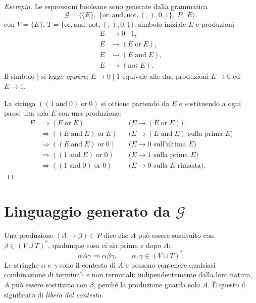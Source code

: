 \documentclass[a4paper, 11pt, oneside]{book}
\theoremstyle{formale}
\newenvironment{esempio}
    {\begin{proof}[\textit{Esempio}]\renewcommand{\qedsymbol}{$\diamond$}}
    {\end{proof}}
\begin{document}
    \begin{esempio}
        Le espressioni booleane sono generate dalla grammatica
        \begin{equation*}
            \mathcal{G} = \langle \{E\},\;
            \{\mathrm{or}, \mathrm{and}, \mathrm{not}, (, ), 0, 1\},\; P,\; E \rangle,
        \end{equation*}
        con $V = \{E\}$, $T = \{\mathrm{or}, \mathrm{and}, \mathrm{not}, (, ), 0, 1\}$,
        simbolo iniziale $E$ e produzioni
        \begin{align*}
            E &\to 0 \mid 1, \\
            E &\to (E \;\mathrm{or}\; E), \\
            E &\to (E \;\mathrm{and}\; E), \\
            E &\to (\mathrm{not}\; E).
        \end{align*}
        Il simbolo $\mid$ si legge \emph{oppure}: $E \to 0 \mid 1$ equivale alle due
        produzioni $E \to 0$ ed $E \to 1$.

        La stringa $((1 \;\mathrm{and}\; 0) \;\mathrm{or}\; 0)$ si ottiene partendo da $E$
        e sostituendo a ogni passo una sola $E$ con una produzione:
        \begin{align*}
            E &\Rightarrow (E \;\mathrm{or}\; E)
                && \text{($E \to (E \;\mathrm{or}\; E)$)} \\
            &\Rightarrow ((E \;\mathrm{and}\; E) \;\mathrm{or}\; E)
                && \text{($E \to (E \;\mathrm{and}\; E)$ sulla prima $E$)} \\
            &\Rightarrow ((E \;\mathrm{and}\; E) \;\mathrm{or}\; 0)
                && \text{($E \to 0$ sull'ultima $E$)} \\
            &\Rightarrow ((1 \;\mathrm{and}\; E) \;\mathrm{or}\; 0)
                && \text{($E \to 1$ sulla prima $E$)} \\
            &\Rightarrow ((1 \;\mathrm{and}\; 0) \;\mathrm{or}\; 0)
                && \text{($E \to 0$ sulla $E$ rimasta)}.
        \end{align*}
    \end{esempio}

    \section{Linguaggio generato da \texorpdfstring{$\mathcal{G}$}{G}}
    Una produzione $(A \to \beta) \in P$ dice che $A$ pu\`o essere sostituito con
    $\beta \in (V \cup T)^*$, qualunque cosa ci sia prima e dopo $A$:
    \begin{equation*}
        \alpha A \gamma \Rightarrow \alpha \beta \gamma,
        \qquad \alpha, \gamma \in (V \cup T)^*.
    \end{equation*}
    Le stringhe $\alpha$ e $\gamma$ sono il contesto di $A$ e possono contenere qualsiasi
    combinazione di terminali e non terminali: indipendentemente dalla loro natura, $A$
    pu\`o essere sostituito con $\beta$, perch\'e la produzione guarda solo $A$. \`E questo
    il significato di \emph{libera dal contesto}.
\end{document}
